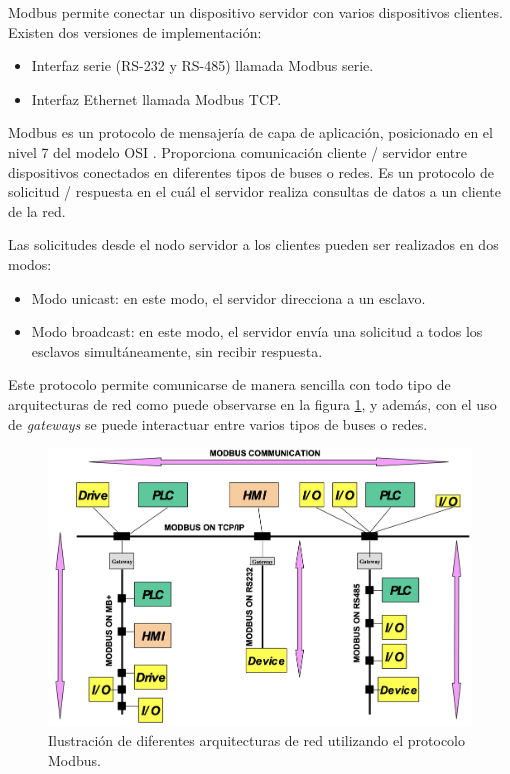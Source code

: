Modbus permite conectar un dispositivo servidor con varios dispositivos clientes.  Existen dos versiones de implementación:
\begin{itemize}
	\item Interfaz serie (RS-232 y RS-485) llamada Modbus serie.
	\item Interfaz Ethernet llamada Modbus TCP.
\end{itemize}



Modbus es un protocolo de mensajería de capa de aplicación, posicionado en el nivel 7 del modelo OSI \citep{WEBSITE:3}. Proporciona comunicación cliente / servidor entre dispositivos conectados en diferentes tipos de buses o redes. Es un protocolo de solicitud / respuesta en el cuál el servidor realiza consultas de datos a un cliente de la red.


Las solicitudes desde el nodo servidor a los clientes pueden ser realizados en dos modos:
\begin{itemize}
	\item Modo unicast: en este modo,  el servidor direcciona a un esclavo.
	\item Modo broadcast: en este modo, el servidor envía una solicitud a todos los esclavos simultáneamente, sin recibir respuesta.
\end{itemize}

Este protocolo permite comunicarse de manera sencilla con todo tipo de arquitecturas de red como puede observarse en la figura \ref{fig:red-modbus}, y además,  con el uso de \textit{gateways} se puede interactuar entre varios tipos de buses o redes.

\begin{figure}[htpb]
	\centering
	\includegraphics[scale=.48]{./Figures/red-modbus.png}
	\caption[Arquitectura de red Modbus.]{Ilustración de diferentes arquitecturas de red utilizando el protocolo Modbus\protect\footnotemark.}
	\label{fig:red-modbus}
\end{figure}

